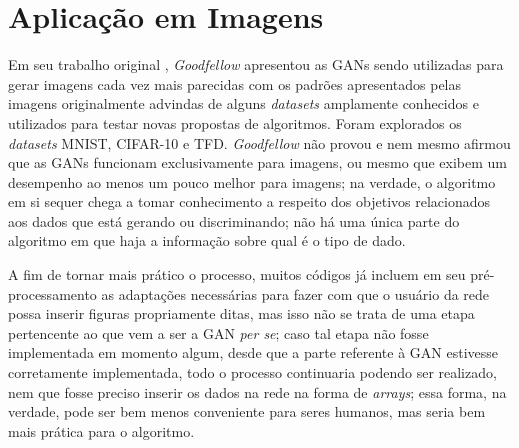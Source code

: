 \section{Aplicação em Imagens}
\label{sec:gan_applications_to_images}

Em seu trabalho original \citep{NIPS2014_5423}, \textit{Goodfellow} apresentou as GANs sendo utilizadas para gerar imagens cada vez mais parecidas com os padrões apresentados pelas imagens originalmente advindas de alguns \textit{datasets} amplamente conhecidos e utilizados para testar novas propostas de algoritmos. Foram explorados os \textit{datasets} MNIST, CIFAR-10 e TFD. \textit{Goodfellow} não provou e nem mesmo afirmou que as GANs funcionam exclusivamente para imagens, ou mesmo que exibem um desempenho ao menos um pouco melhor para imagens; na verdade, o algoritmo em si sequer chega a tomar conhecimento a respeito dos objetivos relacionados aos dados que está gerando ou discriminando; não há uma única parte do algoritmo em que haja a informação sobre qual é o tipo de dado.

A fim de tornar mais prático o processo, muitos códigos já incluem em seu pré-processamento as adaptações necessárias para fazer com que o usuário da rede possa inserir figuras propriamente ditas, mas isso não se trata de uma etapa pertencente ao que vem a ser a GAN \textit{per se}; caso tal etapa não fosse implementada em momento algum, desde que a parte referente à GAN estivesse corretamente implementada, todo o processo continuaria podendo ser realizado, nem que fosse preciso inserir os dados na rede na forma de \textit{arrays}; essa forma, na verdade, pode ser bem menos conveniente para seres humanos, mas seria bem mais prática para o algoritmo.